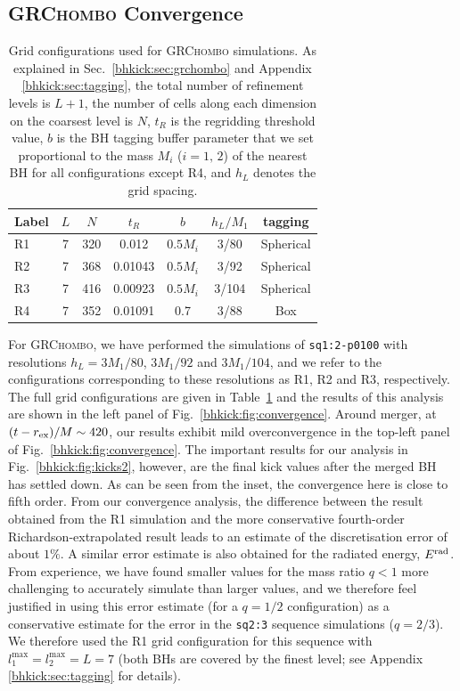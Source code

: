 \subsection{\textsc{GRChombo} Convergence}
\begin{table}[b]
    \caption{Grid configurations used for \textsc{GRChombo} simulations.
    As explained in Sec.~\ref{bhkick:sec:grchombo} and Appendix \ref{bhkick:sec:tagging},
    the total
    number of refinement levels is $L+1$, the number of cells along each
    dimension on the coarsest level is $N$, $t_R$ is the regridding
    threshold value, $b$ is the BH tagging buffer parameter
    that we
    set proportional to the mass $M_i$ ($i=1,\,2$)
    of the nearest BH for all configurations except R4,
    and $h_L$ denotes the grid spacing.
    }
    \centering
    \begin{tabular}{lcccccc}\hline
        Label & $L$ & $N$ & $t_R$ & $b$ & $h_L/M_1$ & tagging\\
        \hline
        R1 & 7 & 320 & 0.012 & $0.5M_i$ & 3/80 & Spherical \\
        R2 & 7 & 368 & 0.01043 & $0.5M_i$ & 3/92 & Spherical\\
        R3 & 7 & 416 & 0.00923 & $0.5M_i$ & 3/104 & Spherical\\
        R4 & 7 & 352 & 0.01091 & 0.7 & 3/88 & Box\\\hline
    \end{tabular}
    \label{bhkick:tab:grchombo-grids}
\end{table}
For \textsc{GRChombo}, we have performed the simulations of
\texttt{sq1:2-p0100} with resolutions $h_L=3M_1/80$, $3M_1/92$ and
$3M_1/104$, and we refer to the configurations corresponding to these
resolutions as R1, R2 and R3, respectively.
The full grid configurations
are given in Table~\ref{bhkick:tab:grchombo-grids} and the results of this
analysis are shown in the left panel of Fig.~\ref{bhkick:fig:convergence}. Around
merger, at $(t-r_{\rm ex})/M\sim 420$, our results exhibit mild
overconvergence
in the top-left panel of Fig.~\ref{bhkick:fig:convergence}.
The important results for our analysis in Fig.~\ref{bhkick:fig:kicks2},
however, are the final kick values after the merged BH has settled down.
As can be seen from the inset, the convergence here is close to
fifth order.
From our convergence
analysis, the difference between the result obtained from the R1 simulation
and the more conservative fourth-order Richardson-extrapolated result leads
to an estimate of the discretisation error of about $1\%$. A similar error
estimate is also obtained for the radiated energy, $E^{\mathrm{rad}}$.
From experience, we have found smaller values for the mass ratio $q<1$
more challenging to accurately simulate than larger values, and we
therefore feel justified in using this error estimate (for a $q=1/2$
configuration) as a conservative estimate for the error in the
\texttt{sq2:3} sequence simulations ($q=2/3$). We therefore used the R1 grid
configuration for this sequence with  $l_1^{\max}=l_2^{\max}=L=7$
(both BHs are covered by
the finest level; see Appendix \ref{bhkick:sec:tagging} for details).

